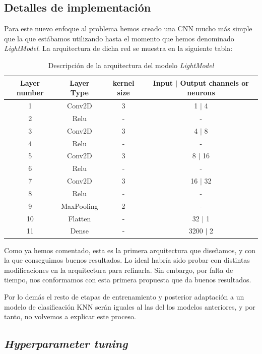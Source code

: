 \documentclass[11pt]{article}
\begin{document}
\subsection{Detalles de implementación}

Para este nuevo enfoque al problema hemos creado una CNN mucho más simple que la que estábamos utilizando hasta el momento que hemos denominado \emph{LightModel}. La arquitectura de dicha red se muestra en la siguiente tabla:

\begin{table}[H]
\begin{center}

    \begin{tabular}{|c|c|c|c|}
        \hline
        Layer number & Layer Type & kernel size &  Input $|$ Output channels or neurons \\
        \hline
        1 & Conv2D & 3 & 1 $|$ 4 \\
        2 & Relu & - & - \\
        3 & Conv2D & 3 & 4 $|$ 8 \\
        4 & Relu & - & - \\
        5 & Conv2D & 3 & 8 $|$ 16 \\
        6 & Relu & - & - \\
        7 & Conv2D & 3 & 16 $|$ 32 \\
        8 & Relu & - & - \\
        9 & MaxPooling & 2 & - \\
        10 & Flatten & - & 32 $|$ 1 \\
        11 & Dense & - & 3200 $|$ 2 \\
    \hline
    \end{tabular}
\end{center}
    \caption{Descripción de la arquitectura del modelo \emph{LightModel}}
\end{table}

Como ya hemos comentado, esta es la primera arquitectura que diseñamos, y con la que conseguimos buenos resultados. Lo ideal habría sido probar con distintas modificaciones en la arquitectura para refinarla. Sin embargo, por falta de tiempo, nos conformamos con esta primera propuesta que da buenos resultados.

Por lo demás el resto de etapas de entrenamiento y posterior adaptación a un modelo de clasificación KNN serán iguales al las del los modelos anteriores, y por tanto, no volvemos a explicar este proceso.

\subsection{\emph{Hyperparameter tuning}}
\end{document}
